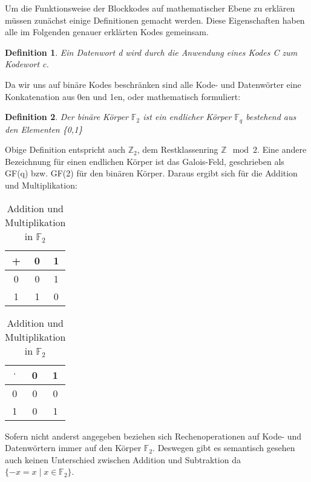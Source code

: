 

Um die Funktionsweise der Blockkodes auf mathematischer Ebene zu erklären müssen zunächst einige Definitionen gemacht werden. Diese Eigenschaften haben alle im Folgenden genauer erklärten Kodes gemeinsam.\newline
\newtheorem{t_def}{Definition}[chapter]
\begin{t_def}
Ein {\em Datenwort d} wird durch die Anwendung eines {\em Kodes C} zum {\em Kodewort c}.
\end{t_def}

Da wir uns auf binäre Kodes beschränken sind alle Kode- und Datenwörter eine Konkatenation aus 0en und 1en, oder mathematisch formuliert:

\begin{t_def}
Der binäre Körper $\mathbb{F}_{2}$ ist ein endlicher Körper $\mathbb{F}_{q}$ bestehend aus den Elementen \{0,1\}
\end{t_def}

Obige Definition entspricht auch $\mathbb{Z}_2$, dem Restklassenring $\mathbb{Z}\mod 2$. Eine andere Bezeichnung für einen endlichen Körper ist das Galois-Feld, geschrieben als GF(q) bzw. GF(2) für den binären Körper. Daraus ergibt sich für die Addition und Multiplikation:
\begin{table}[!h]
\begin{center}
\begin{tabular}{c|cc}
+ & 0 & 1 \\
\hline
0 & 0 & 1 \\
1 & 1 & 0 \\
\end{tabular}
\hspace{2cm}
\begin{tabular}{c|cc}
$\cdot$ & 0 & 1 \\
\hline
0 & 0 & 0 \\
1 & 0 & 1 \\
\end{tabular}
\caption{Addition und Multiplikation in $\mathbb{F}_2$}
\label{table:addmul}
\end{center}
\end{table}

Sofern nicht anderst angegeben beziehen sich Rechenoperationen auf Kode- und Datenwörtern immer auf den Körper $\mathbb{F}_2$. Deswegen gibt es semantisch gesehen auch keinen Unterschied zwischen Addition und Subtraktion da $\{-x = x \mid x \in \mathbb{F}_2\}$.\cite[Kap. 1.1]{huffman2010fundamentals}

